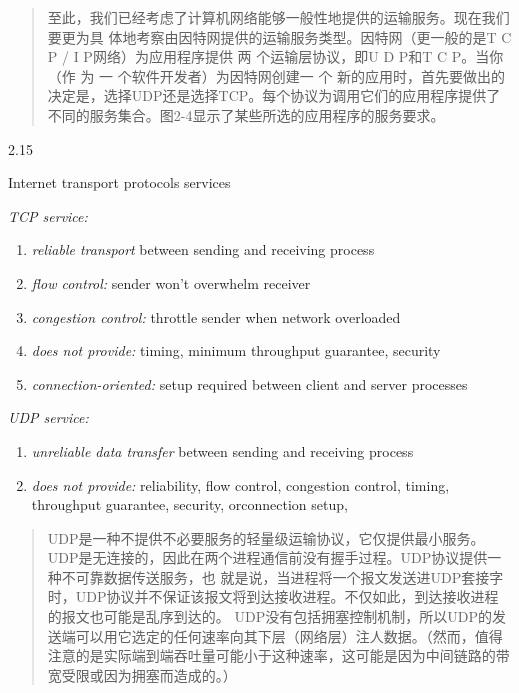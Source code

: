 \documentclass[
]{article}
\begin{document}
\begin{quote}
至此，我们已经考虑了计算机网络能够一般性地提供的运输服务。现在我们要更为具
体地考察由因特网提供的运输服务类型。因特网（更一般的是T C P / I
P网络）为应用程序提供 两 个运输层协议，即U D P和T C P。当你（作 为 一
个软件开发者）为因特网创建一 个
新的应用时，首先要做出的决定是，选择UDP还是选择TCP。每个协议为调用它们的应用程序提供了不同的服务集合。图2-4显示了某些所选的应用程序的服务要求。
\end{quote}

2.15

Internet transport protocols services

\emph{TCP service:}

\begin{enumerate}
\def\labelenumi{\arabic{enumi}.}
\item
  \emph{reliable transport} between sending and receiving process
\item
  \emph{flow control:} sender won't overwhelm receiver
\item
  \emph{congestion control:} throttle sender when network overloaded
\item
  \emph{does not provide:} timing, minimum throughput guarantee,
  security
\item
  \emph{connection-oriented:} setup required between client and server
  processes
\end{enumerate}

\emph{UDP service:}

\begin{enumerate}
\def\labelenumi{\arabic{enumi}.}
\item
  \emph{unreliable data transfer} between sending and receiving process
\item
  \emph{does not provide:} reliability, flow control, congestion
  control, timing, throughput guarantee, security, orconnection setup,
\end{enumerate}

\begin{quote}
UDP是一种不提供不必要服务的轻量级运输协议，它仅提供最小服务。UDP是无连接的，因此在两个进程通信前没有握手过程。UDP协议提供一种不可靠数据传送服务，也
就是说，当进程将一个报文发送进UDP套接字时，UDP协议并不保证该报文将到达接收进程。不仅如此，到达接收进程的报文也可能是乱序到达的。
UDP没有包括拥塞控制机制，所以UDP的发送端可以用它选定的任何速率向其下层（网络层）注人数据。（然而，值得注意的是实际端到端吞吐量可能小于这种速率，这可能是因为中间链路的带宽受限或因为拥塞而造成的。）
\end{quote}
\end{document}
